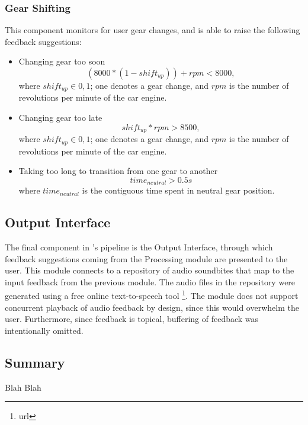 \subsubsection{Gear Shifting}
This component monitors for user gear changes, and is able to raise the following feedback suggestions:
\begin{itemize}
	\item Changing gear too soon
	\begin{equation}
		(8000 * (1 - shift_{up})) + rpm < 8000,
	\end{equation}
	where $shift_{up} \in {0,1}$; one denotes a gear change, and $rpm$ is the number of revolutions per minute of the car engine.	
	\item Changing gear too late
	\begin{equation}
		shift_{up} * rpm > 8500,
	\end{equation}
	where $shift_{up} \in {0,1}$; one denotes a gear change, and $rpm$ is the number of revolutions per minute of the car engine.
	\item Taking too long to transition from one gear to another
	\begin{equation}
		time_{neutral} > 0.5s
	\end{equation}
	where $time_{neutral}$ is the contiguous time spent in neutral gear position.
\end{itemize}

\subsection{Output Interface}
The final component in \methodname's pipeline is the Output Interface, through which feedback suggestions coming from the Processing module are presented to the user. This module connects to a repository of audio soundbites that map to the input feedback from the previous module. The audio files in the repository were generated using a free online text-to-speech tool \footnote{url}. The module does not support concurrent playback of audio feedback by design, since this would overwhelm the user. Furthermore, since feedback is topical, buffering of feedback was intentionally omitted.

\subsection{Summary}
Blah Blah